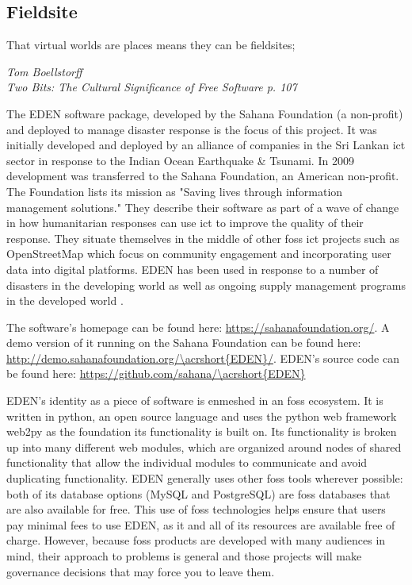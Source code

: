 \documentclass[a4paper,man,natbib]{apa6}
\begin{document}
   \subsection*{Fieldsite}
   \epigraph{That virtual worlds are places means they can be fieldsites;}{\textit{Tom Boellstorff \\ Two Bits: The Cultural Significance of Free Software p. 107}}

   The \acrfull{EDEN} software package, developed by the Sahana Foundation (a non-profit) and deployed to manage disaster response is the focus of this project. It was initially developed and deployed by an alliance of companies in the Sri Lankan \acrfull{ict} sector in response to the Indian Ocean Earthquake \& Tsunami. In 2009 development was transferred to the Sahana Foundation, an American non-profit. The Foundation lists its mission as "Saving lives through information management solutions." They describe their software as part of a wave of change in how humanitarian responses can use \acrshort{ict} to improve the quality of their response. They situate themselves in the middle of other \acrfull{foss} \acrshort{ict} projects such as \Gls{OpenStreetMap} which focus on community engagement and incorporating user data into digital platforms. \acrshort{EDEN} has been used in response to a number of disasters in the developing world as well as ongoing supply management programs in the developed world \citep{Sahana_Foundation_undated-hl}.

   The software's homepage can be found here: \url{https://sahanafoundation.org/}. \linebreak 
   A demo version of it running on the Sahana Foundation can be found here: \url{http://demo.sahanafoundation.org/\acrshort{EDEN}/}. \linebreak 
   \acrshort{EDEN}'s source code can be found here: \url{https://github.com/sahana/\acrshort{EDEN}} \linebreak 

   EDEN's identity as a piece of software is enmeshed in an \acrshort{foss} ecosystem. It is written in \Gls{python}, an open source language and uses the \Gls{python} \gls{web framework} web2py as the foundation its functionality is built on. Its functionality is broken up into many different web modules, which are organized around nodes of shared functionality that allow the individual modules to communicate and avoid duplicating functionality. \acrshort{EDEN} generally uses other \acrshort{foss} tools wherever possible: both of its database options (\Gls{MySQL} and \Gls{PostgreSQL}) are \acrshort{foss} databases that are also available for free. This use of \acrlong{foss} technologies helps ensure that users pay minimal fees to use \acrshort{EDEN}, as it and all of its resources are available free of charge. However, because \acrshort{foss} products are developed with many audiences in mind, their approach to problems is general and those projects will make governance decisions that may force you to leave them.
\end{document}
